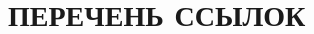 \section*{ПЕРЕЧЕНЬ ССЫЛОК}

\vspace{1\baselineskip} 

\begin{thebibliography}{9}
    
    \the\citetoks
    
\end{thebibliography}

%
%
%
%
